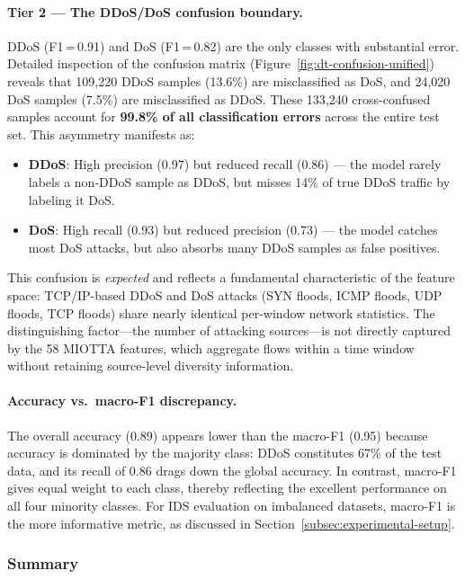 \paragraph{Tier 2 --- The DDoS/DoS confusion boundary.}
DDoS (F1\,=\,0.91) and DoS (F1\,=\,0.82) are the only classes with substantial error. Detailed inspection of the confusion matrix (Figure~\ref{fig:dt-confusion-unified}) reveals that 109,220 DDoS samples (13.6\%) are misclassified as DoS, and 24,020 DoS samples (7.5\%) are misclassified as DDoS. These 133,240 cross-confused samples account for \textbf{99.8\% of all classification errors} across the entire test set. This asymmetry manifests as:
\begin{itemize}[nosep]
  \item \textbf{DDoS}: High precision (0.97) but reduced recall (0.86) --- the model rarely labels a non-DDoS sample as DDoS, but misses 14\% of true DDoS traffic by labeling it DoS.
  \item \textbf{DoS}: High recall (0.93) but reduced precision (0.73) --- the model catches most DoS attacks, but also absorbs many DDoS samples as false positives.
\end{itemize}

This confusion is \textit{expected} and reflects a fundamental characteristic of the feature space: TCP/IP-based DDoS and DoS attacks (SYN floods, ICMP floods, UDP floods, TCP floods) share nearly identical per-window network statistics. The distinguishing factor---the number of attacking sources---is not directly captured by the 58 MIOTTA features, which aggregate flows within a time window without retaining source-level diversity information.

\paragraph{Accuracy vs.\ macro-F1 discrepancy.}
The overall accuracy (0.89) appears lower than the macro-F1 (0.95) because accuracy is dominated by the majority class: DDoS constitutes 67\% of the test data, and its recall of 0.86 drags down the global accuracy. In contrast, macro-F1 gives equal weight to each class, thereby reflecting the excellent performance on all four minority classes. For IDS evaluation on imbalanced datasets, macro-F1 is the more informative metric, as discussed in Section~\ref{subsec:experimental-setup}.

\subsubsection{Summary}

